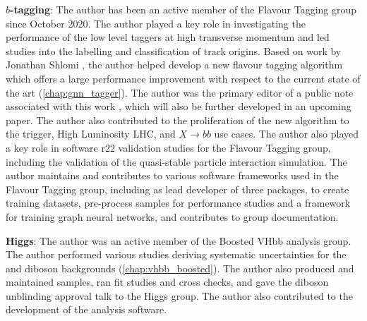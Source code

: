 \textbf{$b$-tagging}:
The author has been an active member of the Flavour Tagging group since October 2020. 
The author played a key role in investigating the performance of the low level taggers at high transverse momentum and led studies into the labelling and classification of track origins.
Based on work by Jonathan Shlomi \cite{2020-gnn-for-sv}, the author helped develop a new flavour tagging algorithm which offers a large performance improvement with respect to the current state of the art (\cref{chap:gnn_tagger}).
The author was the primary editor of a public note associated with this work \cite{ATL-PHYS-PUB-2022-027}, which will also be further developed in an upcoming paper.
The author also contributed to the proliferation of the new algorithm to the trigger, High Luminosity LHC, and $X \rightarrow bb$ use cases.
The author also played a key role in software r22 validation studies for the Flavour Tagging group, including the validation of the quasi-stable particle interaction simulation.
The author maintains and contributes to various software frameworks used in the Flavour Tagging group, including as lead developer of three packages, to create training datasets, pre-process samples for performance studies and a framework for training graph neural networks, and contributes to group documentation.

\textbf{Higgs}:
The author was an active member of the Boosted VHbb analysis group.
The author performed various studies deriving systematic uncertainties for the \Vjets and diboson backgrounds (\cref{chap:vhbb_boosted}).
The author also produced and maintained samples, ran fit studies and cross checks, and gave the diboson unblinding approval talk to the Higgs group.
The author also contributed to the development of the analysis software.
